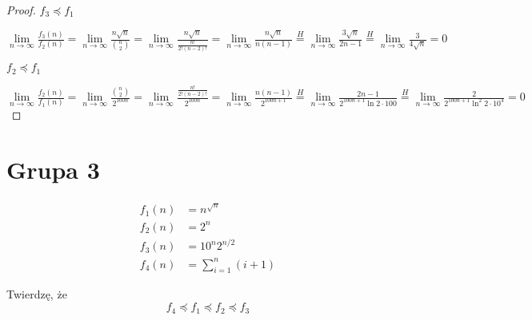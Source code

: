 \documentclass[50pt]{mwart}
\begin{document}
\begin{proof}
	$ f_3\preccurlyeq f_1 $
	
	\noindent$ \lim\limits_{n\to\infty} \frac{f_3(n)}{f_2(n)} = \lim\limits_{n\to\infty} \frac{n\sqrt n}{{n\choose2}} = \lim\limits_{n\to\infty} \frac{n\sqrt n}{\frac{n!}{2!(n-2)!}} = \lim\limits_{n\to\infty} \frac{n\sqrt n}{n(n-1)} \overset{H}{=} \lim\limits_{n\to\infty} \frac{3\sqrt n}{2n - 1} \overset{H}{=} \lim\limits_{n\to\infty} \frac{3}{4\sqrt n} = 0$\newline
	
	$ f_2 \preccurlyeq f_1 $
	
	\noindent$ \lim\limits_{n\to\infty} \frac{f_2(n)}{f_1(n)} = \lim\limits_{n\to\infty} \frac{{n\choose2}}{2^{100n}} = \lim\limits_{n\to\infty} \frac{\frac{n!}{2!(n-2)!}}{2^{100n}} = \lim\limits_{n\to\infty} \frac{n(n-1)}{2^{100n+1}} \overset{H}{=} \lim\limits_{n\to\infty} \frac{2n - 1}{2^{100n+1}\ln2\cdot100} \overset{H}{=} \lim\limits_{n\to\infty} \frac{2}{2^{100n+1}\ln^2 2\cdot10^4} = 0$\newline
\end{proof}

\section{Grupa 3}
\begin{align*}
f_1(n) &= n^{\sqrt n}\\
f_2(n) &= 2^n\\
 f_3(n) &= 10^n2^{n/2} \\
 f_4(n) &= \sum\limits^n_{i=1}(i+1)
\end{align*}

Twierdzę, że
$$ f_4\preccurlyeq f_1\preccurlyeq f_2\preccurlyeq f_3$$
\end{document}
